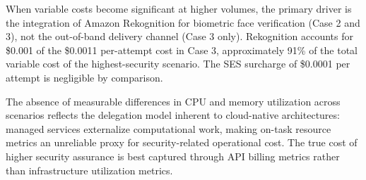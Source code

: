 When variable costs become significant at higher volumes, the primary driver is the integration of Amazon Rekognition for biometric face verification (Case 2 and 3), not the out-of-band delivery channel (Case 3 only). Rekognition accounts for \$0.001 of the \$0.0011 per-attempt cost in Case 3, approximately 91\% of the total variable cost of the highest-security scenario. The SES surcharge of \$0.0001 per attempt is negligible by comparison.

The absence of measurable differences in CPU and memory utilization across scenarios reflects the delegation model inherent to cloud-native architectures: managed services externalize computational work, making on-task resource metrics an unreliable proxy for security-related operational cost. The true cost of higher security assurance is best captured through API billing metrics rather than infrastructure utilization metrics.
